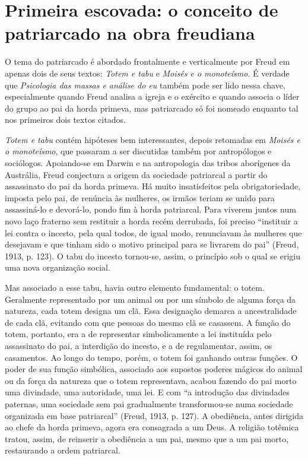 \section{Primeira escovada: o conceito de patriarcado na obra freudiana}

O tema do patriarcado é abordado frontalmente e verticalmente por Freud
em apenas dois de seus textos: \emph{Totem e tabu} e \emph{Moisés e o
monoteísmo}. É verdade que \emph{Psicologia das massas e análise do eu}
também pode ser lido nessa chave, especialmente quando Freud analisa a
igreja e o exército e quando associa o líder do grupo ao pai da horda
primeva, mas patriarcado só foi nomeado enquanto tal nos primeiros dois
textos citados.

\emph{Totem e tabu} contém hipóteses bem interessantes, depois retomadas
em \emph{Moisés e o monoteísmo}, que passaram a ser discutidas também
por antropólogos e sociólogos. Apoiando-se em Darwin e na antropologia
das tribos aborígenes da Austrália, Freud conjectura a origem da
sociedade patriarcal a partir do assassinato do pai da horda primeva. Há
muito insatisfeitos pela obrigatoriedade, imposta pelo pai, de renúncia
às mulheres, os irmãos teriam se unido para assassiná-lo e devorá-lo,
pondo fim à horda patriarcal. Para viverem juntos num novo laço fraterno
sem restituir a horda recém derrubada, foi preciso ``instituir a lei
contra o incesto, pela qual todos, de igual modo, renunciavam às
mulheres que desejavam e que tinham sido o motivo principal para se
livrarem do pai'' (Freud, 1913, p. 123). O tabu do incesto tornou-se,
assim, o princípio sob o qual se erigiu uma nova organização social.

Mas associado a esse tabu, havia outro elemento fundamental: o totem.
Geralmente representado por um animal ou por um símbolo de alguma força
da natureza, cada totem designa um clã. Essa designação demarca a
ancestralidade de cada clã, evitando com que pessoas do mesmo clã se
casassem. A função do totem, portanto, era a de representar
simbolicamente a lei instituída pelo assassinato do pai, a interdição do
incesto, e a de regulamentar, assim, os casamentos. Ao longo do tempo,
porém, o totem foi ganhando outras funções. O poder de sua função
simbólica, associado aos supostos poderes mágicos do animal ou da força
da natureza que o totem representava, acabou fazendo do pai morto uma
divindade, uma autoridade, uma lei. E com ``a introdução das divindades
paternas, uma sociedade sem pai gradualmente transformou-se numa
sociedade organizada em base patriarcal'' (Freud, 1913, p. 127). A
obediência, antes dirigida ao chefe da horda primeva, agora era
consagrada a um Deus. A religião totêmica tratou, assim, de reinserir a
obediência a um pai, mesmo que a um pai morto, restaurando a ordem
patriarcal.

